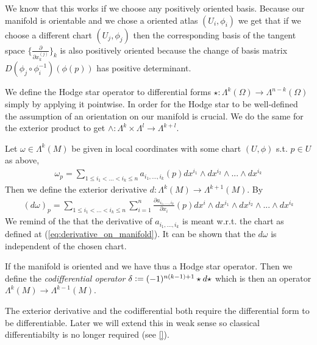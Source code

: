 \documentclass[12pt,a4paper]{article}
\numberwithin{equation}{subsection}
\numberwithin{lemma}{subsection}
\theoremstyle{definition}
\begin{document}
We know that this works if we choose any positively oriented basis. 
Because our manifold is orientable and we chose a oriented atlas 
$(U_i,\phi_i)$ we get that if we choose a different chart $(U_j,\phi_j)$ 
then the 
corresponding basis of the tangent space
$\{ \frac{\partial}{\partial x^(j)_k} \}_k$ is also positively oriented because
the change of basis matrix $D(\phi_j \circ \phi_i^{-1})(\phi(p))$ has positive
determinant.

We define the Hodge star operator to differential forms 
$\star: \Lambda^k(\Omega) \rightarrow \Lambda^{n-k}(\Omega)$ simply by applying it 
pointwise. In order for 
the Hodge star to be well-defined the assumption of an orientation on our 
manifold is crucial. We do the same for the exterior product to get
$\wedge: \Lambda^k \times \Lambda^l \rightarrow \Lambda^{k+l}$. 


Let $\omega \in \Lambda^k (M)$ be given 
in local coordinates with some chart $(U,\phi)$ s.t. $p\in U$ as above,
\begin{align*}
    \omega_p = \sum\limits_{1\leq i_1 < ... < i_k \leq n} 
        a_{i_1,...,i_k}(p) dx^{i_1} \wedge dx^{i_2} \wedge ... \wedge dx^{i_k}
\end{align*}
Then we define the exterior derivative $d: \Lambda^{k}(M) \rightarrow 
\Lambda^{k+1}(M)$. By
\begin{align*}
    (d\omega)_p = \sum\limits_{1\leq i_1 < ... < i_k \leq n} \sum\limits_{i=1}^n
    \frac{\partial a_{i_1,...,i_k}}{\partial x_i}(p) 
    dx^i \wedge dx^{i_1} \wedge dx^{i_2} \wedge ... \wedge dx^{i_k}
\end{align*}
We remind of the that the derivative of $a_{i_1,...,i_k}$ is meant w.r.t. 
the chart as defined at (\ref{eq:derivative_on_manifold}).
It can be shown that the $d\omega$ is independent of the chosen chart. 

If the manifold is oriented and we have thus a Hodge star operator.
Then we define the \textit{codifferential operator}
$\delta \vcentcolon= (-1)^{n(k-1)+1} \star d \star$ which is then 
an operator $\Lambda^{k}(M) \rightarrow 
\Lambda^{k-1}(M)$.

The exterior derivative and the codifferential both require the differential 
form to be differentiable. Later we will extend this in weak sense so 
classical differentiabilty is no longer required (see \ref{}).
\end{document}
